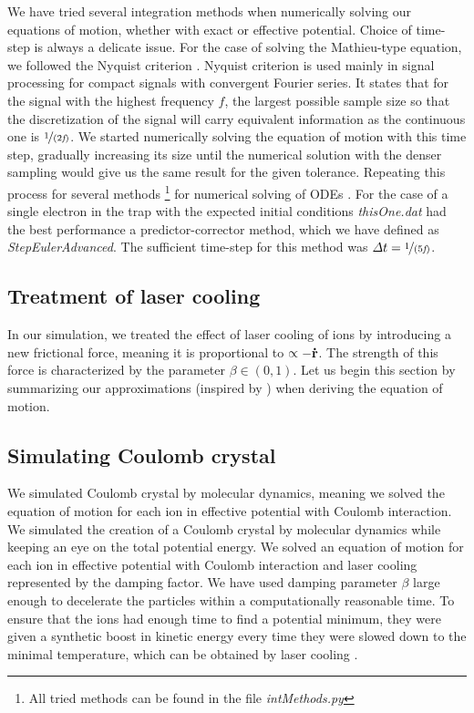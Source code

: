 We have tried several integration methods when numerically solving our equations of motion, whether with exact or effective potential.
Choice of time-step is always a delicate issue. For the case of solving the Mathieu-type equation, we followed the Nyquist criterion . Nyquist criterion is used mainly in signal processing for compact signals with convergent Fourier series. It states that for the signal with the highest frequency $f$, the largest possible sample size so that the discretization of the signal will carry equivalent information as the continuous one is $\nicefrac{1}{(2 \textit{f})}$. We started numerically solving the equation of motion with this time step, gradually increasing its size until the numerical solution with the denser sampling would give us the same result for the given tolerance. Repeating this process for several methods \footnote{All tried methods can be found in the file \textit{intMethods.py}} for numerical solving of ODEs \cite{teukolsky1992numerical}. For the case of a single electron in the trap with the expected initial conditions \textit{thisOne.dat} had the best performance a predictor-corrector method, which we have defined as \textit{StepEulerAdvanced}. The sufficient time-step for this method was $\Delta t = \nicefrac{1}{(5 \textit{f})}$. 

\subsection{Treatment of laser cooling}
In our simulation, we treated the effect of laser cooling of ions by introducing a new frictional force, meaning it is proportional to $\propto - \vb{\dot{r}}$. The strength of this force is characterized by the parameter $\beta \in (0,1)$. 
Let us begin this section by summarizing our approximations (inspired by \cite{Friedman_1982}) when deriving the equation of motion. 

\subsection{Simulating Coulomb crystal}
We simulated Coulomb crystal by molecular dynamics, meaning we solved the equation of motion for each ion in effective potential with Coulomb interaction. 
We simulated the creation of a Coulomb crystal by molecular dynamics while keeping an eye on the total potential energy. We solved an equation of motion for each ion in effective potential with Coulomb interaction and laser cooling represented by the damping factor. We have used damping parameter $\beta$ large enough to decelerate the particles within a computationally reasonable time. To ensure that the ions had enough time to find a potential minimum, they were given a synthetic boost in kinetic energy every time they were slowed down to the minimal temperature, which can be obtained by laser cooling . 

